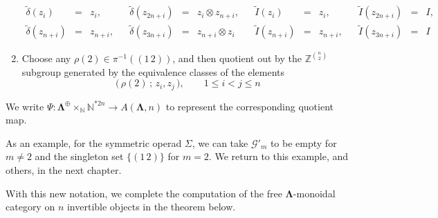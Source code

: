 \documentclass{amsbook} %
\newcommand{\ML}{\mathbf{\Lambda}}
\numberwithin{section}{chapter}
\begin{document}
\begin{Defi}
\begin{enumerate}
\[\begin{array}{rclcrclcrclcrcl}
			\tilde{\delta}(z_i) & = & z_i, & & \tilde{\delta}(z_{2n+i}) & = & z_i \otimes z_{n+i}, & & \tilde{I}(z_i) & = & z_i, & &\tilde{I}(z_{2n+i}) & = & I,\\
			\tilde{\delta}(z_{n+i}) & = & z_{n+i}, &  & \tilde{\delta}(z_{3n+i}) & = & z_{n+i} \otimes z_i & & \tilde{I}(z_{n+i}) & = & z_{n+i}, & & \tilde{I}(z_{3n+i}) & = & I
			 \end{array}
\] 
\item Choose any $\rho(2) \in \pi^{-1}((1 \, 2))$, and then quotient out by the $\mathbb{Z}^{{n}\choose{2}}$ subgroup generated by the equivalence classes of the elements 
\[ \big( \, \rho(2) \, ; \, z_i, z_j \, \big), \quad \quad 1 \le i < j \le n \]
\end{enumerate}
We write $\Psi \colon  \ML^{\oplus} \times_{\mathbb{N}} \mathbb{N}^{\ast 2n} \to A(\ML,n)$ to represent the corresponding quotient map. 
\end{Defi}

\begin{example}
As an example, for the symmetric operad $\Sigma$, we can take $\mathcal{G}'_m$ to be empty for $m \neq 2$ and the singleton set $\{ ( 1 \, 2 ) \}$ for $m=2$. We return to this example, and others, in the next chapter.
\end{example}

With this new notation, we complete the computation of the free $\ML$-monoidal category on $n$ invertible objects in the theorem below.
\end{document}
